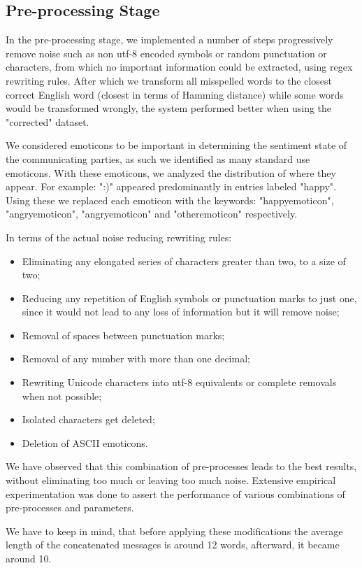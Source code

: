 \documentclass[11pt,a4paper]{article}
\begin{document}
\subsection{Pre-processing Stage}

In the pre-processing stage, we implemented a number of steps progressively remove noise such as non utf-8 encoded symbols or random punctuation or characters, from which no important information could be extracted, using regex rewriting rules. After which we transform all misspelled words to the closest correct English word (closest in terms of Hamming distance) while some words would be transformed wrongly, the system performed better when using the "corrected" dataset.

We considered emoticons to be important in determining the sentiment state of the communicating parties, as such we identified as many standard use emoticons. With these emoticons, we analyzed the distribution of where they appear. For example: ":)" appeared predominantly in entries labeled "happy". Using these we replaced each emoticon with the keywords: "happyemoticon", "angryemoticon", "angryemoticon" and "otheremoticon" respectively.

In terms of the actual noise reducing rewriting rules:
\begin{itemize}
    \item Eliminating any elongated series of characters greater than two, to a size of two;
    \item Reducing any repetition of English symbols or punctuation marks to just one, since it would not lead to any loss of information but it will remove noise;
    \item Removal of spaces between punctuation marks;
    \item Removal of any number with more than one decimal;
    \item Rewriting Unicode characters into utf-8 equivalents or complete removals when not possible;
    \item Isolated characters get deleted;
    \item Deletion of ASCII emoticons.
\end{itemize}

We have observed that this combination of pre-processes leads to the best results, without eliminating too much or leaving too much noise. Extensive empirical experimentation was done to assert the performance of various combinations of pre-processes and parameters.

We have to keep in mind, that before applying these modifications the average length of the concatenated messages is around 12 words, afterward, it became around 10. 
\end{document}
